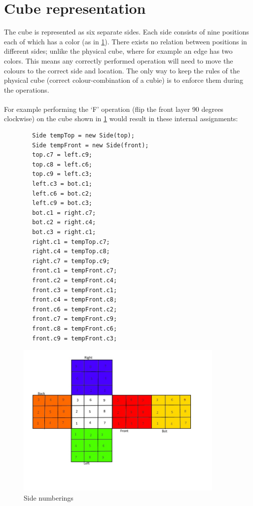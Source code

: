 \documentclass[a4paper,11pt]{kth-mag}
\begin{document}
\section{Cube representation}
 The cube is represented as six separate sides. Each side consists of nine positions each of which has a color (as in \ref{fig_17}). There exists no relation between positions in different sides; unlike the physical cube, where for example an edge has two colors. This means any correctly performed operation will need to move the colours to the correct side and location. The only way to keep the rules of the physical cube (correct colour-combination of a cubie) is to enforce them during the operations.\\\\
 For example performing the `F' operation (flip the front layer 90 degrees clockwise) on the cube shown in \ref{fig_17} would result in these internal assignments:
 \begin{verbatim}
		Side tempTop = new Side(top);
		Side tempFront = new Side(front);
		top.c7 = left.c9;
		top.c8 = left.c6;
		top.c9 = left.c3;
		left.c3 = bot.c1;
		left.c6 = bot.c2;
		left.c9 = bot.c3;
		bot.c1 = right.c7;
		bot.c2 = right.c4;
		bot.c3 = right.c1;
		right.c1 = tempTop.c7;
		right.c4 = tempTop.c8;
		right.c7 = tempTop.c9;
		front.c1 = tempFront.c7;
		front.c2 = tempFront.c4;
		front.c3 = tempFront.c1;
		front.c4 = tempFront.c8;
		front.c6 = tempFront.c2;
		front.c7 = tempFront.c9;
		front.c8 = tempFront.c6;
		front.c9 = tempFront.c3;
\end{verbatim}
\begin{figure}[b]
	\centering
	\includegraphics[width= 0.9\textwidth]{figs/cubeorder.jpg}
	\caption{Side numberings}
	\label{fig_17}
\end{figure}  
\end{document}
